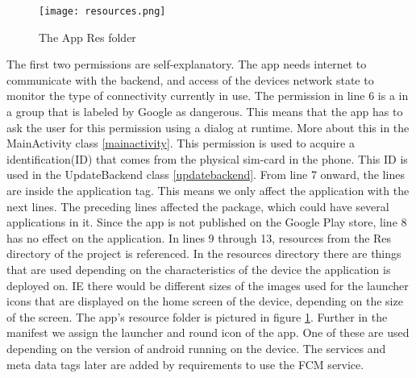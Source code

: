 \begin{figure}[!htb]
	\centering
	\texttt{[image: resources.png]}
	\caption{The App Res folder \label{resourceFolder} }
\end{figure} 

The first two permissions are self-explanatory. The app needs internet to communicate with the backend, and access of the devices network state to monitor the type of connectivity currently in use. The permission in line 6 is a in a group that is labeled by Google as dangerous. This means that the app has to ask the user for this permission using a dialog at runtime. More about this in the MainActivity class \ref{mainactivity}. This permission is used to acquire a identification(ID) that comes from the physical sim-card in the phone. This ID is used in the UpdateBackend class \ref{updatebackend}. From line 7 onward, the lines are inside the application tag. This means we only affect the application with the next lines. The preceding lines affected the package, which could have several applications in it. Since the app is not published on the Google Play store, line 8 has no effect on the application. In lines 9 through 13, resources from the Res directory of the project is referenced. In the resources directory there are things that are used depending on the characteristics of the device the application is deployed on. IE there would be different sizes of the images used for the launcher icons that are displayed on the home screen of the device, depending on the size of the screen. The app's resource folder is pictured in figure \ref{resourceFolder}. Further in the manifest we assign the launcher and round icon of the app. One of these are used depending on the version of android running on the device. The services and meta data tags later are added by requirements to use the FCM service.

